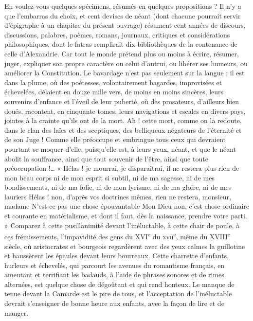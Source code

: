 \documentclass[french,twoside]{book} %
\begin{document}
En voulez-vous quelques spécimens, résumés en quelques propositions ? Il n’y a que l’embarras du choix, et cent devises de néant (dont chacune pourrait servir d’épigraphe à un chapitre du présent ouvrage) résument cent années de discours, discussions, palabres, poèmes, romans, journaux, critiques et considérations philosophiques, dont le fatras remplirait dix bibliothèques de la contenance de celle d’Alexandrie. Car tout le monde prétend plus ou moins à écrire, résumer, juger, expliquer son propre caractère ou celui d’autrui, ou libérer ses humeurs, ou améliorer la Constitution. Le bavardage n’est pas seulement sur la langue ; il est dans la plume, où des poétesses, volontairement hagardes, improvisées et échevelées, délaient en douze mille vers, de moins en moins sincères, leurs souvenirs d’enfance et l’éveil de leur puberté, où des prosateurs, d’ailleurs bien doués, racontent, en cinquante tomes, leurs navigations et escales en divers pays, jointes à la crainte qu’ils ont de la mort. Ah ! cette mort, comme on la redoute, dans le clan des laïcs et des sceptiques, des belliqueux négateurs de l’éternité et de son Juge ! Comme elle préoccupe et embringue tous ceux qui devraient pourtant se moquer d’elle, puisqu’elle est, à leurs yeux, néant, et que le néant abolit la souffrance, ainsi que tout souvenir de l’être, ainsi que toute préoccupation !… « Hélas ! je mourrai, je disparaîtrai, il ne restera plus rien de mon beau corps ni de mon esprit si subtil, ni de ma sagesse, ni de mes bondissements, ni de ma folie, ni de mon lyrisme, ni de ma gloire, ni de mes lauriers Hélas ! non, d’après vos doctrines mêmes, rien ne restera, monsieur, madame N’est-ce pas une chose épouvantable Mon Dieu non, c’est chose ordinaire et courante en matérialisme, et dont il faut, dès la naissance, prendre votre parti. » Comparez à cette pusillanimité devant l’inéluctable, à cette chair de poule, à ces frémissements, l’impavidité des gens du XVI\textsuperscript{e} du \textsc{xvii}\textsuperscript{e}, même du XVIII\textsuperscript{e} siècle, où aristocrates et bourgeois regardèrent avec des yeux calmes la guillotine et haussèrent les épaules devant leurs bourreaux. Cette charrette d’enfants, hurleurs et échevelés, qui parcourt les avenues du romantisme français, en ameutant et terrifiant les badauds, à l’aide de phrases sonores et de rimes alternées, est quelque chose de dégoûtant et qui rend honteux. Le manque de tenue devant la Camarde est le pire de tous, et l’acceptation de l’inéluctable devrait s’enseigner de bonne heure aux enfants, avec la façon de lire et de manger.\par
\end{document}

